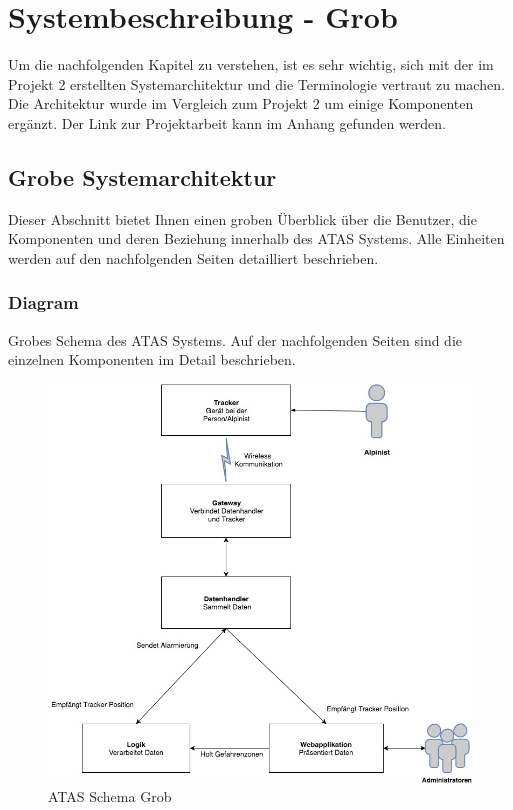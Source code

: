 \documentclass[11pt,english,german]{report}
\theoremstyle{definition}
\begin{document}
\chapter{Systembeschreibung - Grob}
Um die nachfolgenden Kapitel zu verstehen, ist es sehr wichtig, sich mit der im Projekt 2 erstellten Systemarchitektur und die Terminologie vertraut zu machen. Die Architektur wurde im Vergleich zum Projekt 2 um einige Komponenten ergänzt. Der Link zur Projektarbeit kann im Anhang gefunden werden.

\section{Grobe Systemarchitektur}
Dieser Abschnitt bietet Ihnen einen groben Überblick über die Benutzer, die Komponenten und deren Beziehung innerhalb des ATAS Systems. Alle Einheiten werden auf den nachfolgenden Seiten detailliert beschrieben.

\newpage
\subsection{Diagram}
Grobes Schema des ATAS Systems. Auf der nachfolgenden Seiten sind die einzelnen Komponenten im Detail beschrieben.\\[0.3cm]
\begin{figure}[H]
	\centering
	\includegraphics[width=\textwidth]{img/system/ATAS_SystemOverview_Abstract_BA.jpg}
	\caption[ATAS Schema Grob]
	{ATAS Schema Grob}
\end{figure}
\end{document}
